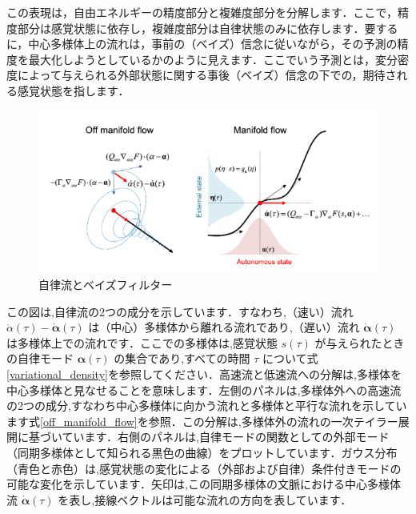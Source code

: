 \documentclass[a4paper, titlepage]{jsarticle}
\begin{document}
\par
この表現は，自由エネルギーの精度部分と複雑度部分を分解します．ここで，精度部分は感覚状態に依存し，複雑度部分は自律状態のみに依存します．要するに，中心多様体上の流れは，事前の（ベイズ）信念に従いながら，その予測の精度を最大化しようとしているかのように見えます．ここでいう予測とは，変分密度によって与えられる外部状態に関する事後（ベイズ）信念の下での，期待される感覚状態を指します．
\par
\begin{figure}[htbp]
   \centering
   \includegraphics[scale=0.8]{Autonomous_flows_and_Bayesian_filters.png}
   \caption{自律流とベイズフィルター}
   \label{Autonomous_flows_and_Bayesian_filters}
\end{figure}
{
    \footnotesize
    \noindent
    この図は,自律流の2つの成分を示しています．すなわち,（速い）流れ$\dot{\alpha}(\tau) - \dot{\bm{\alpha}}(\tau)$ は（中心）多様体から離れる流れであり,（遅い）流れ $\dot{\bm{\alpha}}(\tau)$ は多様体上での流れです．ここでの多様体は,感覚状態 $s(\tau)$ が与えられたときの自律モード $\bm{\alpha}(\tau)$ の集合であり,すべての時間 $\tau$ について式\eqref{variational_density}を参照してください．高速流と低速流への分解は,多様体を中心多様体と見なせることを意味します．左側のパネルは,多様体外への高速流の2つの成分,すなわち中心多様体に向かう流れと多様体と平行な流れを示しています式\eqref{off_manifold_flow}を参照．この分解は,多様体外の流れの一次テイラー展開に基づいています．右側のパネルは,自律モードの関数としての外部モード（同期多様体として知られる黒色の曲線）をプロットしています．ガウス分布（青色と赤色）は,感覚状態の変化による（外部および自律）条件付きモードの可能な変化を示しています．矢印は,この同期多様体の文脈における中心多様体流 $\dot{\bm{\alpha}}(\tau)$ を表し,接線ベクトルは可能な流れの方向を表しています．
}
\end{document}

